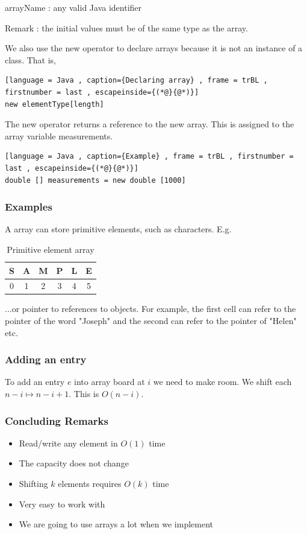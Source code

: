 \documentclass[a4paper]{article}
\theoremstyle{plain}
\theoremstyle{definition}
\theoremstyle{remark}
\begin{document}
arrayName : any valid Java identifier

Remark : the initial values must be of the same type as the array.

We also use the new operator to declare arrays because it is not an instance of a class. That is,
\begin{lstlisting}[language = Java , caption={Declaring array} , frame = trBL , firstnumber = last , escapeinside={(*@}{@*)}]
new elementType[length]
\end{lstlisting}
The new operator returns a reference to the new array. This is assigned to the array variable measurements.
\begin{lstlisting}[language = Java , caption={Example} , frame = trBL , firstnumber = last , escapeinside={(*@}{@*)}]
double [] measurements = new double [1000]
\end{lstlisting}
\subsubsection{Examples}
A array can store primitive elements, such as characters. E.g.
\begin{table}[H]
	\centering
	\caption{Primitive element array}
	\label{tab:label}
	\begin{tabular}{|c|c|c|c|c|c|}
	\hline
	S & A  & M  & P  & L & E  \\
	\hline
	0 & 1 & 2 & 3 & 4 & 5 \\
	\hline
	\end{tabular}
\end{table}
...or pointer to references to objects. For example, the first cell can refer to the pointer of the word "Joseph" and the second can refer to the pointer of "Helen" etc.
\subsubsection{Adding an entry}
To add an entry $e$ into array board at $i$ we need to make room. We shift each $n-i \mapsto n-i+1$. This is $O(n-i)$.
\subsubsection{Concluding Remarks}
\begin{itemize}
	\item Read/write any element in $O(1)$ time
	\item The capacity does not change
	\item Shifting $k$ elements requires $O(k)$ time
	\item Very easy to work with
	\item We are going to use arrays a lot when we implement
\end{itemize}
\end{document}
